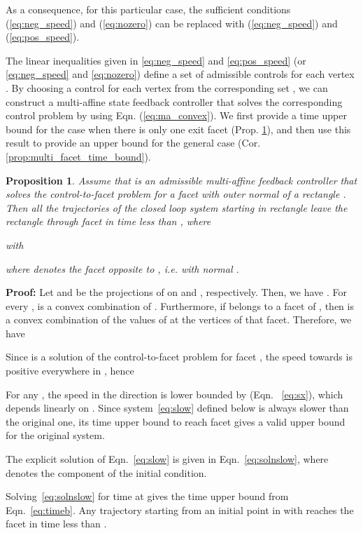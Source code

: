 \documentclass{ifacconf}
\newtheorem{proposition}{Proposition}
\begin{document}
As a consequence, for this particular case, the sufficient conditions (\ref{eq:neg_speed}) and (\ref{eq:nozero}) can be replaced with (\ref{eq:neg_speed}) and 
(\ref{eq:pos_speed}). 


The linear inequalities given in \eqref{eq:neg_speed} and \eqref{eq:pos_speed} (or  \eqref{eq:neg_speed} and  \eqref{eq:nozero}) 
define a set of admissible controls  for each vertex . By choosing a control for each vertex  from the corresponding set , we can construct a multi-affine state feedback controller  that solves the corresponding control problem by using Eqn. (\ref{eq:ma_convex}). We first provide a time upper bound for the case when there is only one exit facet (Prop. \ref{prop:time_bound}), and then use this result to provide an upper bound for the general case (Cor. \ref{prop:multi_facet_time_bound}). 

\begin{proposition}\label{prop:time_bound}
Assume that  is an admissible multi-affine feedback controller that solves the control-to-facet problem for a facet  with outer normal  of a rectangle . Then all the trajectories of the closed loop system starting in rectangle  leave the rectangle through facet  in time less than , where

with

where  denotes the facet opposite to , i.e. with normal .
\end{proposition}

{\bf Proof:} \newcommand{\lambdaP}{\ensuremath{\frac{b_i - x_i}{b_i - a_i}}} 
Let  and  be the projections of  on  and , respectively. Then, we have .  
For every ,  is a convex combination of 
  . Furthermore, if  belongs to
  a facet of , then  is a convex combination of the
  values of  at the vertices of that facet. 
  Therefore, we have
  
  Since  is a solution of the control-to-facet problem for facet , the speed towards  is positive everywhere in , hence
  

  For any , the speed in the  direction is lower bounded by  (Eqn. ~\eqref{eq:sx}), which depends linearly on .  Since system~\eqref{eq:slow} 
 defined below is always slower than the original one, its time upper bound to reach facet  gives a valid upper bound for the original system.

	
	The explicit solution of Eqn.~\eqref{eq:slow} is given in Eqn.~\eqref{eq:solnslow}, where  denotes the  component of the initial condition.
	
  	Solving~\eqref{eq:solnslow} for time  at  gives the time upper bound from Eqn.~\eqref{eq:timeb}. Any trajectory starting from an initial point  in  with  reaches the facet  in time less than . 
	
\end{document}
